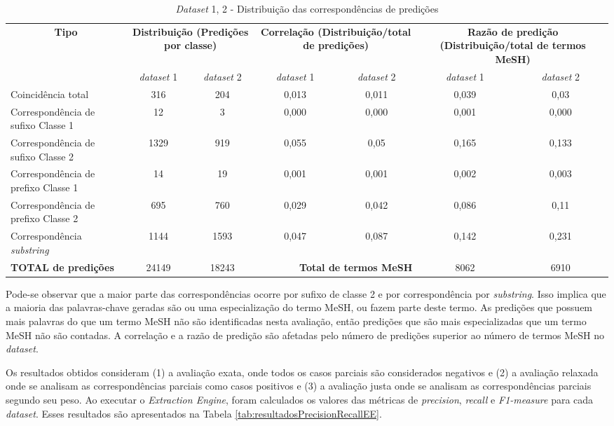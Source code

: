 \begin{table}[htbp]
\begin{center}
\begin{tabular}{|p{3cm}|c|c|c|c|c|c|}
\hline
\multicolumn{ 1}{|c|}{\textbf{Tipo}} & \multicolumn{ 2}{p{3cm}|}{\textbf{Distribuição (Predições por classe)}} & \multicolumn{ 2}{p{3cm}|}{\textbf{Correlação (Distribuição/total de predições)}} & \multicolumn{ 2}{p{3cm}|}{\textbf{Razão de predição (Distribuição/total de termos MeSH)}} \\ \cline{ 2- 7}
\multicolumn{ 1}{|l|}{} & \emph{dataset} 1 & \emph{dataset} 2 & \emph{dataset} 1 & \emph{dataset} 2 & \emph{dataset} 1 & \emph{dataset} 2 \\ \hline
Coincidência total & 316 & 204 & 0,013 & 0,011 & 0,039 & 0,03 \\ \hline
Correspondência de sufixo Classe 1 & 12 & 3 & 0,000 & 0,000 & 0,001 & 0,000 \\ \hline
Correspondência de sufixo Classe 2 & 1329 & 919 & 0,055 & 0,05 & 0,165 & 0,133 \\ \hline
Correspondência de prefixo Classe 1 & 14 & 19 & 0,001 & 0,001 & 0,002 & 0,003 \\ \hline
Correspondência de prefixo Classe 2 & 695 & 760 & 0,029 & 0,042 & 0,086 & 0,11 \\ \hline
Correspondência \emph{substring}  & 1144 & 1593 & 0,047 & 0,087 & 0,142 & 0,231 \\ \hline
\textbf{TOTAL de predições} & 24149 & 18243 & \multicolumn{ 2}{r|}{\textbf{Total de termos MeSH}} & 8062 & 6910 \\ \hline
\end{tabular}
\end{center}
\caption{\emph{Dataset} 1, 2 - Distribuição das correspondências de predições}
\label{tab:distribuicaoJusta}
\end{table}

Pode-se observar que a maior parte das correspondências ocorre por sufixo de classe 2 e por correspondência por \emph{substring}. Isso implica que a maioria das palavras-chave geradas são ou uma especialização do termo MeSH, ou fazem parte deste termo. As predições que possuem mais palavras do que um termo MeSH não são identificadas nesta avaliação, então predições que são mais especializadas que um termo MeSH não são contadas. A correlação e a razão de predição são afetadas pelo número de predições superior ao número de termos MeSH no \emph{dataset}.

Os resultados obtidos consideram (1) a avaliação exata, onde todos os casos parciais são considerados negativos e (2) a avaliação relaxada onde se analisam as correspondências parciais como casos positivos e (3) a avaliação justa onde se analisam as correspondências parciais segundo seu peso. Ao executar o \emph{Extraction Engine}, foram calculados os valores das métricas de \emph{precision}, \emph{recall} e \emph{F1-measure} para cada \emph{dataset}. Esses resultados são apresentados na Tabela \ref{tab:resultadosPrecisionRecallEE}.

